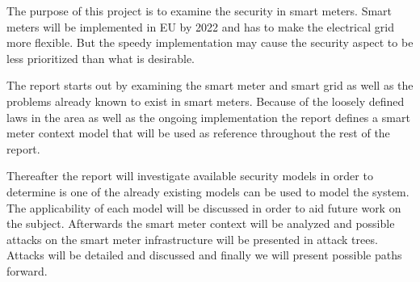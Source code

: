 The purpose of this project is to examine the security in smart meters.
Smart meters will be implemented in EU by 2022 and has to make the electrical grid more flexible.
But the speedy implementation may cause the security aspect to be less prioritized than what is desirable.

The report starts out by examining the smart meter and smart grid as well as the problems already known to exist in smart meters.
Because of the loosely defined laws in the area as well as the ongoing implementation the report defines a smart meter context model that will be used as reference throughout the rest of the report.

Thereafter the report will investigate available security models in order to determine is one of the already existing models can be used to model the system.
The applicability of each model will be discussed in order to aid future work on the subject.
Afterwards the smart meter context will be analyzed and possible attacks on the smart meter infrastructure will be presented in attack trees.
Attacks will be detailed and discussed and finally we will present possible paths forward.